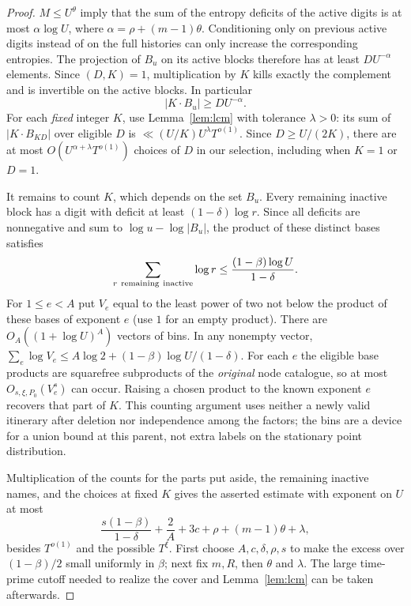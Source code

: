 \begin{proof}
$M\le U^\theta$ imply that the sum of the entropy deficits of the
active digits is at most
$\alpha\log U$, where $\alpha=\rho+(m-1)\theta$.
Conditioning only on previous active digits instead of on the full
histories can only increase the corresponding entropies. The
projection of $B_u$ on its active blocks therefore has at least
$D U^{-\alpha}$ elements. Since $(D,K)=1$, multiplication by $K$
kills exactly the complement and is invertible on the active blocks.
In particular
\[
                 |K\cdot B_u|\ge D U^{-\alpha}.
\]
For each \emph{fixed} integer $K$, use Lemma~\ref{lem:lcm} with
tolerance $\lambda>0$: its sum of $|K\cdot B_{KD}|$ over eligible
$D$ is $\ll (U/K)U^\lambda T^{o(1)}$. Since $D\ge U/(2K)$, there
are at most $O(U^{\alpha+\lambda}T^{o(1)})$ choices of $D$ in
our selection, including when $K=1$ or $D=1$.

It remains to count $K$, which depends on the set $B_u$. Every
remaining inactive block has a digit with deficit at least
$(1-\delta)\log r$. Since all deficits are nonnegative and sum
to $\log u-\log|B_u|$, the product of these distinct bases satisfies
\[
    \sum_{r\ {\rm remaining\ inactive}}\log r
           \le \frac{(1-\beta)\log U}{1-\delta}.
\]
For $1\le e<A$ put $V_e$ equal to the least power of two not below
the product of these bases of exponent $e$ (use $1$ for an empty
product). There are $O_A((1+\log U)^A)$ vectors of bins. In any
nonempty vector,
$\sum_e\log V_e\le A\log2+(1-\beta)\log U/(1-\delta)$.
For each $e$ the eligible base products are squarefree subproducts
of the \emph{original} node catalogue, so at most
$O_{s,\xi,P_0}(V_e^s)$ can occur. Raising a chosen product to the
known exponent $e$ recovers that part of $K$. This counting argument
uses neither a newly valid itinerary after deletion nor independence
among the factors; the bins are a device for a union bound at this
parent, not extra labels on the stationary point distribution.

Multiplication of the counts for the parts put aside, the remaining
inactive names, and the choices at fixed $K$ gives the asserted
estimate with exponent on $U$ at most
\[
 \frac{s(1-\beta)}{1-\delta}
       +\frac2A+3c+\rho+(m-1)\theta+\lambda ,
\]
besides $T^{o(1)}$ and the possible $T^\xi$. First choose
$A,c,\delta,\rho,s$ to make the excess over $(1-\beta)/2$
small uniformly in $\beta$; next fix $m,R$, then $\theta$ and
$\lambda$. The large time-prime cutoff needed to realize the
cover and Lemma~\ref{lem:lcm} can be taken afterwards.
\end{proof}
